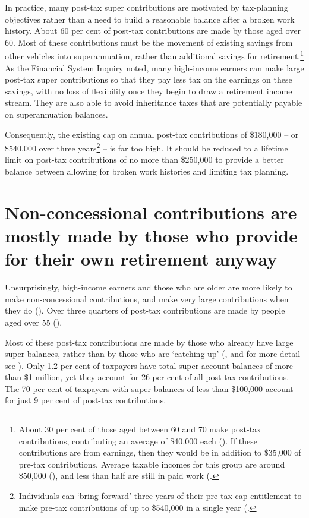 In practice, many post-tax super contributions are motivated by tax-planning objectives rather than a need to build a reasonable balance after a broken work history. About 60 per cent of post-tax contributions are made by those aged over 60. Most of these contributions must be the movement of existing savings from other vehicles into superannuation, rather than additional savings for retirement.\footnote{About 30 per cent of those aged between 60 and 70 make post-tax contributions, contributing an average of \$40,000 each (). If these contributions are from earnings, then they would be in addition to \$35,000 of pre-tax contributions. Average taxable incomes for this group are around \$50,000 (\textcite{ATO2015SampleFile1213}), and less than half are still in paid work (\textcite[][58]{ProductivityCommission2013AgeingAustralia}.}  As the Financial System Inquiry noted, many high-income earners can make large post-tax super contributions so that they pay less tax on the earnings on these savings, with no loss of flexibility once they begin to draw a retirement income stream.  They are also able to avoid inheritance taxes that are potentially payable on superannuation balances.

Consequently, the existing cap on annual post-tax contributions of \$180,000 – or \$540,000 over three years\footnote{Individuals can ‘bring forward’ three years of their pre-tax cap entitlement to make pre-tax contributions of up to \$540,000 in a single year (\textcite{ATO2015SuperContr--too-much-super-can-mean-extra-tax}.} – is far too high.  It should be reduced to a lifetime limit on post-tax contributions of no more than \$250,000 to provide a better balance between allowing for broken work histories and limiting tax planning. 

\section{Non-concessional contributions are mostly made by those who provide for their own retirement anyway}\label{sec:SUPER-5-1}
Unsurprisingly, high-income earners and those who are older are more likely to make non-concessional contributions, and make very large contributions when they do (). Over three quarters of post-tax contributions are made by people aged over 55 (). 

Most of these post-tax contributions are made by those who already have large super balances, rather than by those who are ‘catching up’ (, and for more detail see ). Only 1.2 per cent of taxpayers have total super account balances of more than \$1 million, yet they account for 26 per cent of all post-tax contributions. The 70 per cent of taxpayers with super balances of less than \$100,000 account for just 9 per cent of post-tax contributions.  

